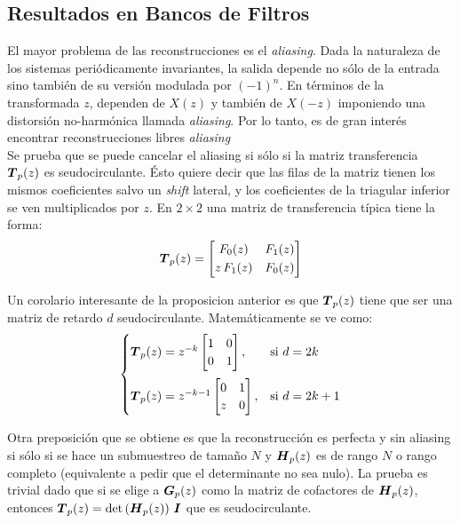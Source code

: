 	\subsection{Resultados en Bancos de Filtros}
	El mayor problema de las reconstrucciones es el \emph{aliasing}. Dada la naturaleza de los sistemas periódicamente invariantes, la salida depende no sólo de la entrada sino también de su versión modulada por $(-1)^n$. En términos de la transformada $z$, dependen de $X(z)$ y también de $X(-z)$ imponiendo una distorsión no-harmónica llamada \emph{aliasing}. Por lo tanto, es de gran interés encontrar reconstrucciones libres \emph{aliasing}\\

		Se prueba que se puede cancelar el aliasing si sólo si la matriz transferencia $\boldsymbol{T}_p(z)$ es seudocirculante. Ésto quiere decir que las filas de la matriz tienen los mismos coeficientes salvo un \emph{shift} lateral, y los coeficientes de la triagular inferior se ven multiplicados por $z$. En $2\times 2$ una matriz de transferencia típica tiene la forma:
		\begin{equation*}
		\boldsymbol{T}_p(z) = \begin{bmatrix} F_0 (z) & F_1(z) \\[0.3em] z\, F_1(z) & F_0(z) \end{bmatrix}
		\end{equation*}
			
		Un corolario interesante de la proposicion anterior es que $\boldsymbol{T}_p(z)$ tiene que ser una matriz de retardo $d$ seudocirculante. Matemáticamente se ve como:
		\begin{equation*}
		\begin{cases}\boldsymbol{T}_p(z)=z^{-k}\begin{bmatrix}1&0\\0&1\end{bmatrix}, &\text{si }d=2k \\[0.5cm]
		\boldsymbol{T}_p(z)=z^{-k-1}\begin{bmatrix}0&1\\z&0\end{bmatrix}, &\text{si }d=2k+1\end{cases}
		\end{equation*}

		Otra preposición que se obtiene es que la reconstrucción es perfecta y sin aliasing si sólo si se hace un submuestreo de tamaño $N$ y $\boldsymbol{H}_p(z)$ es de rango $N$ o rango completo (equivalente a pedir que el determinante no sea nulo). La prueba es trivial dado que si se elige a $\boldsymbol{G}_p(z)$ como la matriz de cofactores de $\boldsymbol{H}_p(z)$, entonces $\boldsymbol{T}_p(z) = \det\left(\boldsymbol{H}_p(z)\right)\,\boldsymbol{I}$ que es seudocirculante.\\

